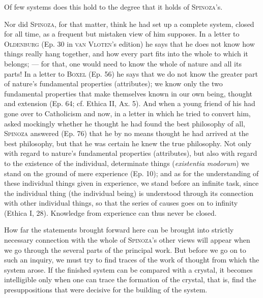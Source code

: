 \documentclass[12pt]{article}
\begin{document}
Of few systems does this hold to the degree that it holds of \textsc{Spinoza}'s.

Nor did \textsc{Spinoza}, for that matter, think he had set up a complete system,
closed for all time, as a frequent but mistaken view of him supposes. In a letter
to \textsc{Oldenburg} (Ep. 30 in \textsc{van Vloten}'s edition) he says that he does
not know how things really hang together, and how every part fits into the whole
to which it belongs; --- for that, one would need to know the whole of nature and
all its parts! In a letter to \textsc{Boxel} (Ep. 56) he says that we do not know
the greater part of nature's fundamental properties (attributes); we know only the
two fundamental properties that make themselves known in our own being, thought
and extension (Ep. 64; cf. Ethica II, Ax. 5). And when a young friend of his had
gone over to Catholicism and now, in a letter in which he tried to convert him,
asked mockingly whether he thought he had found the best philosophy of all,
\textsc{Spinoza} answered (Ep. 76) that he by no means thought he had arrived at the
best philosophy, but that he was certain he knew the true philosophy. Not only with
regard to nature's fundamental properties (attributes), but also with regard to the
existence of the individual, determinate things (\textit{existentia modorum}) we
stand on the ground of mere experience (Ep. 10); and as for the understanding of
these individual things given in experience, we stand before an infinite task,
since the individual thing (the individual being) is understood through its
connection with other individual things, so that the series of causes goes on to
infinity (Ethica I, 28). Knowledge from experience can thus never be closed.

How far the statements brought forward here can be brought into strictly necessary
connection with the whole of \textsc{Spinoza}'s other views will appear when we go
through the several parts of the principal work. But before we go on to such an
inquiry, we must try to find traces of the work of thought from which the system
arose. If the finished system can be compared with a crystal, it becomes
intelligible only when one can trace the formation of the crystal, that is, find
the presuppositions that were decisive for the building of the system.
\end{document}
